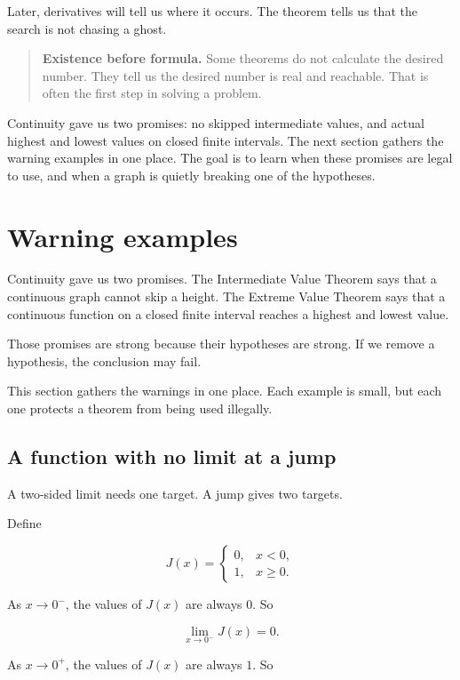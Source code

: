 Later, derivatives will tell us where it occurs.  The theorem tells us that the search is not chasing a ghost.

\begin{quote}
\textbf{Existence before formula.}
Some theorems do not calculate the desired number.  They tell us the desired number is real and reachable.  That is often the first step in solving a problem.
\end{quote}

Continuity gave us two promises: no skipped intermediate values, and actual highest and lowest values on closed finite intervals.  The next section gathers the warning examples in one place.  The goal is to learn when these promises are legal to use, and when a graph is quietly breaking one of the hypotheses.
\section{Warning examples}
\label{sec:warning-examples-limits-continuity}

Continuity gave us two promises.  The Intermediate Value Theorem says that a continuous graph cannot skip a height.  The Extreme Value Theorem says that a continuous function on a closed finite interval reaches a highest and lowest value.

Those promises are strong because their hypotheses are strong.  If we remove a hypothesis, the conclusion may fail.

This section gathers the warnings in one place.  Each example is small, but each one protects a theorem from being used illegally.

\subsection{A function with no limit at a jump}
\label{subsec:no-limit-at-jump-warning}

A two-sided limit needs one target.  A jump gives two targets.

Define

\[
J(x)=
\begin{cases}
0, & x<0,\\
1, & x\ge 0.
\end{cases}
\]

As \(x\to0^-\), the values of \(J(x)\) are always \(0\).  So

\[
\lim_{x\to0^-}J(x)=0.
\]

As \(x\to0^+\), the values of \(J(x)\) are always \(1\).  So

